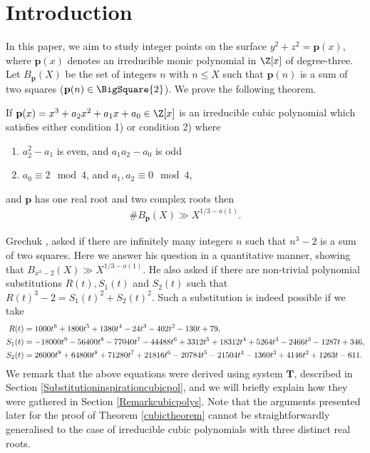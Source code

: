 \documentclass[12pt]{amsart}
\newcommand{\1}{\mathmybb{1}}
\begin{document}
\section{Introduction}
In this paper, we aim to study integer points on the surface $y^2+z^2 = \mathbf{p}(x)$, where $\mathbf{p}(x)$ denotes an irreducible monic polynomial in $\Z[x]$ of degree-three.
Let $B_{\mathbf{p}}(X)$ be the set of integers $n$ with $n \leq X$ such that $\mathbf{p}(n)$ is a sum of two squares ($\mathbf{p}(n)\in \BigSquare{2}$). We prove the following theorem.
\begin{thm}
\label{cubictheorem}
If $\mathbf{p}(x) = x^3+a_{2}x^2+a_{1}x+a_{0} \in \Z[x]$ is an irreducible cubic polynomial which satisfies either condition 1) or condition 2) where
\begin{enumerate}
\item $a_{2}^2-a_{1}$ is even, and $a_{1}a_{2}-a_{0}$ is odd
\item $a_{0} \equiv 2 \mod 4$, and $a_{1},a_{2} \equiv 0 \mod 4$,
\end{enumerate}
and $\mathbf{p}$ has one real root and two complex roots then
\begin{align*}
\#B_{\mathbf{p}}(X) \gg X^{1/3 - o(1)}.
\end{align*}
\end{thm}
Grechuk \cite{Grechuk}, \cite[p. 406]{Grechbook} asked if there are infinitely many integers $n$ such that $n^3-2$ is a sum of two squares. Here we answer his question in a quantitative manner, showing that $B_{x^3-2}(X)\gg X^{1/3-o(1)}$. He also asked if there are non-trivial polynomial substitutions $R(t), S_{1}(t)$ and $S_{2}(t)$ such that $R(t)^3-2 = S_{1}(t)^2+S_{2}(t)^2$. Such a substitution is indeed possible if we take
{\tiny
\begin{align}
\label{Substitutionforncubedmin2}
R(t) &= 1000 t^6 + 1800 t^5 + 1380 t^4 - 24 t^3 - 402 t^2 - 130 t + 79, \\
S_{1}(t) &= -18000t^9 - 56400t^8 - 77040t^7 - 44488t^6 + 3312t^5 + 18312t^4 + 5264t^3 - 2466t^2 - 1287t + 346, \notag \\
S_{2}(t) &= 26000t^9 + 64800t^8 + 71280t^7 + 21816t^6 - 20784t^5 - 21504t^4 - 1360t^3 + 4146t^2 + 1263t - 611. \notag
\end{align}
}
We remark that the above equations were derived using system $\mathbf{T}$, described in Section \ref{Substitutioninspirationcubicpol}, and we will briefly explain how they were gathered in Section \ref{Remarkcubicpolys}. Note that the arguments presented later for the proof of Theorem \ref{cubictheorem} cannot be straightforwardly generalised to the case of irreducible cubic polynomials with three distinct real roots.
\end{document}
